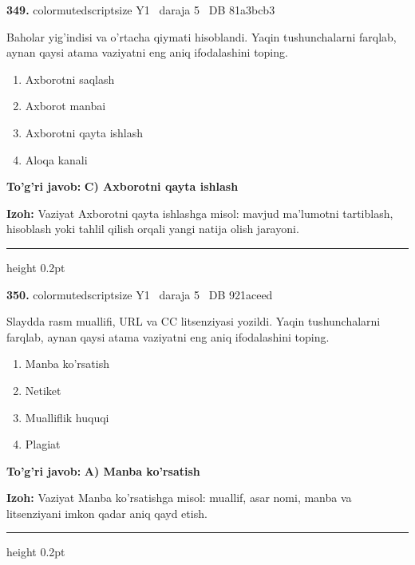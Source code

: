 \documentclass[10pt,a4paper,oneside]{article}
\begin{document}
\noindent\textbf{\color{ink}349.}  {color{muted}scriptsize Y1 \textbullet\ daraja 5 \textbullet\ DB 81a3bcb3}
\par
Baholar yig'indisi va o'rtacha qiymati hisoblandi. Yaqin tushunchalarni farqlab, aynan qaysi atama vaziyatni eng aniq ifodalashini toping.
\begin{enumerate}[label=\Alph*),leftmargin=9mm]
\item Axborotni saqlash
\item Axborot manbai
\item Axborotni qayta ishlash
\item Aloqa kanali
\end{enumerate}
\begin{tcolorbox}[enhanced,breakable,colback=teal!4,colframe=teal!50!black,boxrule=0.5pt,arc=1.1mm,left=3mm,right=3mm,top=1.7mm,bottom=1.7mm,before skip=2mm,after skip=2mm]
\textbf{\color{teal}To'g'ri javob:} \textbf{C) Axborotni qayta ishlash}
\par\smallskip
\textbf{Izoh:} Vaziyat Axborotni qayta ishlashga misol: mavjud ma'lumotni tartiblash, hisoblash yoki tahlil qilish orqali yangi natija olish jarayoni.
\end{tcolorbox}
\vspace{2mm}\hrule height 0.2pt \vspace{3mm}

\noindent\textbf{\color{ink}350.}  {color{muted}scriptsize Y1 \textbullet\ daraja 5 \textbullet\ DB 921aceed}
\par
Slaydda rasm muallifi, URL va CC litsenziyasi yozildi. Yaqin tushunchalarni farqlab, aynan qaysi atama vaziyatni eng aniq ifodalashini toping.
\begin{enumerate}[label=\Alph*),leftmargin=9mm]
\item Manba ko'rsatish
\item Netiket
\item Mualliflik huquqi
\item Plagiat
\end{enumerate}
\begin{tcolorbox}[enhanced,breakable,colback=teal!4,colframe=teal!50!black,boxrule=0.5pt,arc=1.1mm,left=3mm,right=3mm,top=1.7mm,bottom=1.7mm,before skip=2mm,after skip=2mm]
\textbf{\color{teal}To'g'ri javob:} \textbf{A) Manba ko'rsatish}
\par\smallskip
\textbf{Izoh:} Vaziyat Manba ko'rsatishga misol: muallif, asar nomi, manba va litsenziyani imkon qadar aniq qayd etish.
\end{tcolorbox}
\vspace{2mm}\hrule height 0.2pt \vspace{3mm}
\end{document}
